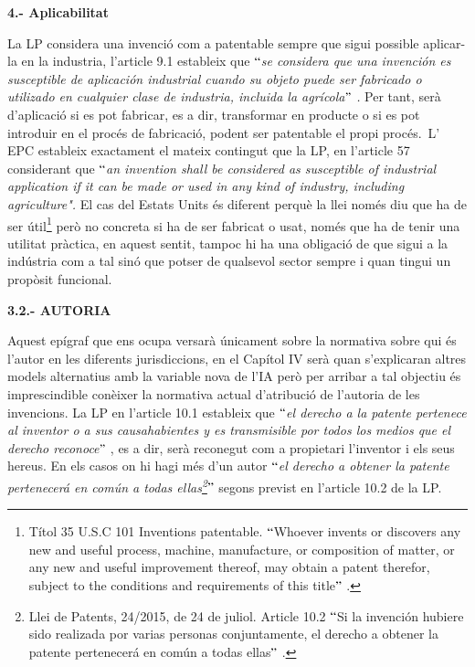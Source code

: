 \documentclass[12pt]{article}
\begin{document}
\vspace{\baselineskip}
\textbf{4.- Aplicabilitat}\par


\vspace{\baselineskip}
\begin{justify}
La LP considera una invenció com a patentable sempre que sigui possible aplicar-la en la industria, l’article 9.1 estableix que $``$\textit{se considera que una invención es susceptible de aplicación industrial cuando su objeto puede ser fabricado o utilizado en cualquier clase de industria, incluida la agrícola$"$ .} Per tant, serà d’aplicació si es pot fabricar, es a dir, transformar en producte o si es pot introduir en el procés de fabricació, podent ser patentable el propi procés.\  L’ EPC estableix exactament el mateix contingut que la LP, en l’article 57 considerant que $``$\textit{an invention shall be considered as susceptible of industrial application if it can be made or used in any kind of industry, including agriculture". }El cas del Estats Units és diferent perquè la llei només diu que ha de ser útil\footnote{ Títol 35 U.S.C 101 Inventions patentable. $``$Whoever invents or discovers any new and useful process, machine, manufacture, or composition of matter, or any new and useful improvement thereof, may obtain a patent therefor, subject to the conditions and requirements of this title$"$ .  } però no concreta si ha de ser fabricat o usat, només que ha de tenir una utilitat pràctica, en aquest sentit, tampoc hi ha una obligació de que sigui a la indústria com a tal sinó que potser de qualsevol sector sempre i quan tingui un propòsit funcional. 
\end{justify}\par


\vspace{\baselineskip}
\begin{justify}
\textbf{3.2.- AUTORIA }
\end{justify}\par


\vspace{\baselineskip}
\begin{justify}
Aquest epígraf que ens ocupa versarà únicament sobre la normativa sobre qui és l’autor en les diferents jurisdiccions, en el Capítol IV serà quan s’explicaran altres models alternatius amb la variable nova de l’IA però per arribar a tal objectiu és imprescindible conèixer la normativa actual d’atribució de l’autoria de les invencions.  La LP en l’article 10.1 estableix que \textit{$``$el derecho a la patente pertenece al inventor o a sus causahabientes y es transmisible por todos los medios que el derecho reconoce$"$ }, es a dir, serà reconegut com a propietari l’inventor i els seus hereus. En els casos on hi hagi més d’un autor $``$\textit{el derecho a obtener la patente pertenecerá en común a todas ellas\footnote{ Llei de Patents, 24/2015, de 24 de juliol. Article 10.2 $``$Si la invención hubiere sido realizada por varias personas conjuntamente, el derecho a obtener la patente pertenecerá en común a todas ellas$"$ . }$"$ } segons previst en l’article 10.2 de la LP. 
\end{justify}\par
\end{document}
